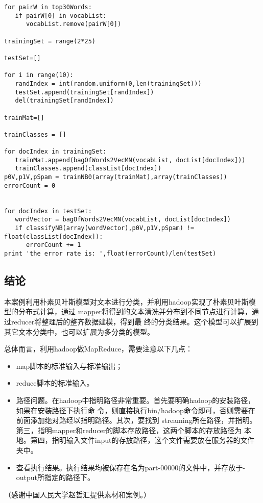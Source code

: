 \begin{lstlisting}
for pairW in top30Words:
   if pairW[0] in vocabList:
      vocabList.remove(pairW[0])

trainingSet = range(2*25)

testSet=[]

for i in range(10):
   randIndex = int(random.uniform(0,len(trainingSet)))
   testSet.append(trainingSet[randIndex])
   del(trainingSet[randIndex])

trainMat=[]

trainClasses = []

for docIndex in trainingSet:
   trainMat.append(bagOfWords2VecMN(vocabList, docList[docIndex]))
   trainClasses.append(classList[docIndex])
p0V,p1V,pSpam = trainNB0(array(trainMat),array(trainClasses))
errorCount = 0


for docIndex in testSet:
   wordVector = bagOfWords2VecMN(vocabList, docList[docIndex])
   if classifyNB(array(wordVector),p0V,p1V,pSpam) != float(classList[docIndex]):
      errorCount += 1
print 'the error rate is: ',float(errorCount)/len(testSet)
\end{lstlisting}

\subsection{结论}\label{ux7ed3ux8bba}

本案例利用朴素贝叶斯模型对文本进行分类，并利用hadoop实现了朴素贝叶斯模型的分布式计算，通过
mapper将得到的文本清洗并分布到不同节点进行计算，通过reducer将整理后的整齐数据建模，得到最
终的分类结果。这个模型可以扩展到其它文本分类中，也可以扩展为多分类的模型。

总体而言，利用hadoop做MapReduce，需要注意以下几点：

\begin{itemize}
\item
  map脚本的标准输入与标准输出；
\item
  reduce脚本的标准输入。
\item
  路径问题。在hadoop中指明路径非常重要。首先要明确hadoop的安装路径，如果在安装路径下执行命
  令，则直接执行bin/hadoop命令即可，否则需要在前面添加绝对路经以指明路径。其次，要找到
  streaming所在路径，并指明。第三，指明mapper和reducer的脚本存放路径，这两个脚本的存放路径为
  本地。第四，指明输入文件input的存放路径，这个文件需要放在服务器的文件夹中。
\item
  查看执行结果。执行结果均被保存在名为part-00000的文件中，并存放于-output所指定的路径下。
\end{itemize}

（感谢中国人民大学赵哲汇提供素材和案例。）
